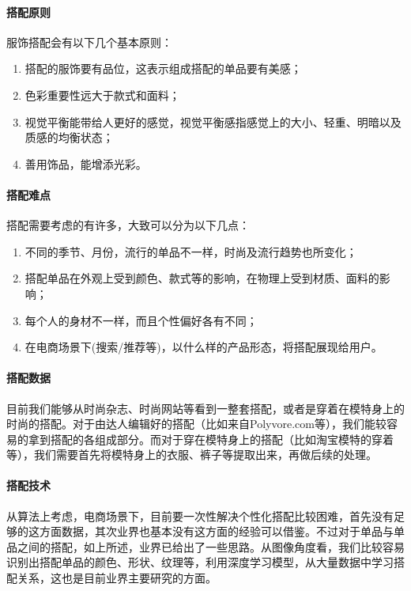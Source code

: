 \paragraph{搭配原则}
服饰搭配会有以下几个基本原则：
\begin{enumerate}
\item 搭配的服饰要有品位，这表示组成搭配的单品要有美感；
\item 色彩重要性远大于款式和面料；
\item 视觉平衡能带给人更好的感觉，视觉平衡感指感觉上的大小、轻重、明暗以及质感的均衡状态；
\item 善用饰品，能增添光彩。
\end{enumerate}


\paragraph{搭配难点}
搭配需要考虑的有许多，大致可以分为以下几点：
\begin{enumerate}
\item 不同的季节、月份，流行的单品不一样，时尚及流行趋势也所变化；
\item 搭配单品在外观上受到颜色、款式等的影响，在物理上受到材质、面料的影响；
\item 每个人的身材不一样，而且个性偏好各有不同；
\item 在电商场景下(搜索/推荐等)，以什么样的产品形态，将搭配展现给用户。
\end{enumerate}

\paragraph{搭配数据}
目前我们能够从时尚杂志、时尚网站等看到一整套搭配，或者是穿着在模特身上的时尚的搭配。对于由达人编辑好的搭配（比如来自Polyvore.com等），我们能较容易的拿到搭配的各组成部分。而对于穿在模特身上的搭配（比如淘宝模特的穿着等），我们需要首先将模特身上的衣服、裤子等提取出来，再做后续的处理。

\paragraph{搭配技术}
从算法上考虑，电商场景下，目前要一次性解决个性化搭配比较困难，首先没有足够的这方面数据，其次业界也基本没有这方面的经验可以借鉴。不过对于单品与单品之间的搭配，如上所述，业界已给出了一些思路。从图像角度看，我们比较容易识别出搭配单品的颜色、形状、纹理等，利用深度学习模型，从大量数据中学习搭配关系，这也是目前业界主要研究的方面。

